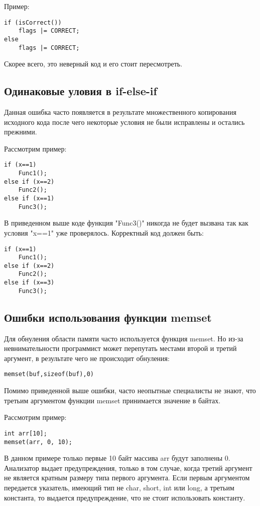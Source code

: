 Пример:
\begin{lstlisting}
if (isCorrect())
	flags |= CORRECT;
else
	flags |= CORRECT;
\end{lstlisting}

Скорее всего, это неверный код и его стоит пересмотреть.

\subsection{Одинаковые уловия в if-else-if}
\label{sec:eqCond}
Данная ошибка часто появляется в результате множественного копирования исходного кода после чего 
некоторые условия не были исправлены и остались прежними.

Рассмотрим пример:
\begin{lstlisting}
if (x==1)
	Func1();
else if (x==2)
	Func2();
else if (x==1)
	Func3();
\end{lstlisting}

В приведенном выше коде функция "Func3()" никогда не будет вызвана так как условия "x==1" уже
проверялось. Корректный код должен быть:
\begin{lstlisting}
if (x==1)
	Func1();
else if (x==2)
	Func2();
else if (x==3)
	Func3();
\end{lstlisting}

\subsection{Ошибки использования функции memset}
\label{sec:memset}
Для обнуления области памяти часто используется функция memset. Но из-за невнимательности программист может 
перепутать местами второй и третий аргумент, в результате чего не происходит обнуления:
\begin{lstlisting}
memset(buf,sizeof(buf),0)
\end{lstlisting}
Помимо приведенной выше ошибки, часто неопытные специалисты не знают, что третьим аргументом 
функции memset принимается значение в байтах.

Рассмотрим пример:
\begin{lstlisting}
int arr[10];
memset(arr, 0, 10);
\end{lstlisting}
В данном примере только первые 10 байт массива arr будут заполнены 0. Анализатор выдает предупреждения, 
только в том случае, когда третий аргумент не является кратным размеру типа первого аргумента. 
Если первым аргументом передается указатель, имеющий тип не char, short, int или long, а третьим константа, то
выдается предупреждение, что не стоит использовать константу.

